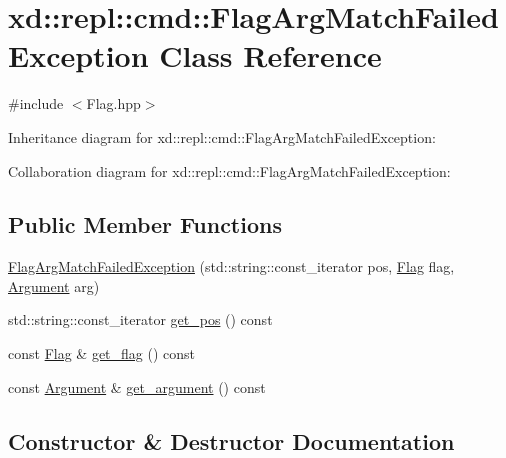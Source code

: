 \hypertarget{classxd_1_1repl_1_1cmd_1_1_flag_arg_match_failed_exception}{}\section{xd\+:\+:repl\+:\+:cmd\+:\+:Flag\+Arg\+Match\+Failed\+Exception Class Reference}
\label{classxd_1_1repl_1_1cmd_1_1_flag_arg_match_failed_exception}


{\ttfamily \#include $<$Flag.\+hpp$>$}



Inheritance diagram for xd\+:\+:repl\+:\+:cmd\+:\+:Flag\+Arg\+Match\+Failed\+Exception\+:


Collaboration diagram for xd\+:\+:repl\+:\+:cmd\+:\+:Flag\+Arg\+Match\+Failed\+Exception\+:
\subsection*{Public Member Functions}
\begin{DoxyCompactItemize}
\item 
\mbox{\hyperlink{classxd_1_1repl_1_1cmd_1_1_flag_arg_match_failed_exception_aea13c443add603c78b127026ae9da2ff}{Flag\+Arg\+Match\+Failed\+Exception}} (std\+::string\+::const\+\_\+iterator pos, \mbox{\hyperlink{classxd_1_1repl_1_1cmd_1_1_flag}{Flag}} flag, \mbox{\hyperlink{classxd_1_1repl_1_1cmd_1_1_argument}{Argument}} arg)
\item 
std\+::string\+::const\+\_\+iterator \mbox{\hyperlink{classxd_1_1repl_1_1cmd_1_1_flag_arg_match_failed_exception_ad3fae363fabebfb547a2e0f3ac36f298}{get\+\_\+pos}} () const
\item 
const \mbox{\hyperlink{classxd_1_1repl_1_1cmd_1_1_flag}{Flag}} \& \mbox{\hyperlink{classxd_1_1repl_1_1cmd_1_1_flag_arg_match_failed_exception_a81eb656576cce4b337d9fab59fd5f899}{get\+\_\+flag}} () const
\item 
const \mbox{\hyperlink{classxd_1_1repl_1_1cmd_1_1_argument}{Argument}} \& \mbox{\hyperlink{classxd_1_1repl_1_1cmd_1_1_flag_arg_match_failed_exception_a02aca3505ed1ff6d6b2e3b1644e595e9}{get\+\_\+argument}} () const
\end{DoxyCompactItemize}


\subsection{Constructor \& Destructor Documentation}
\mbox{\label{classxd_1_1repl_1_1cmd_1_1_flag_arg_match_failed_exception_aea13c443add603c78b127026ae9da2ff}} 
